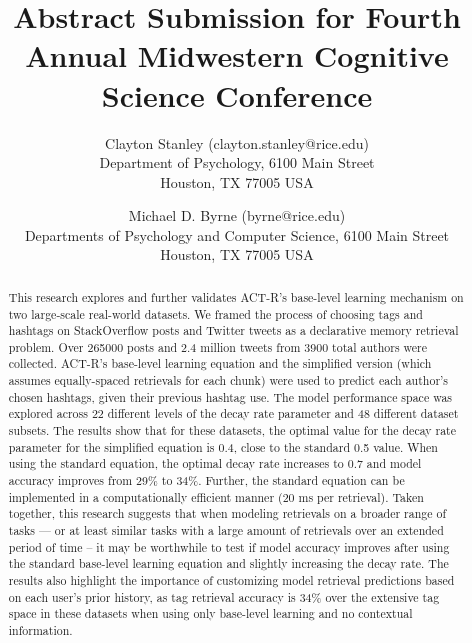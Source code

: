 \documentclass[english]{article}
\title{Abstract Submission for Fourth Annual Midwestern Cognitive Science Conference}
\author{Clayton Stanley (clayton.stanley@rice.edu) \\
  Department of Psychology, 6100 Main Street \\
  Houston, TX 77005 USA 
  \and Michael D. Byrne (byrne@rice.edu) \\
  Departments of Psychology and Computer Science, 6100 Main Street \\
  Houston, TX 77005 USA \\
}
\begin{document}
\maketitle

\begin{abstract}
  This research explores and further validates ACT-R's base-level learning mechanism on two large-scale real-world datasets.
  We framed the process of choosing tags and hashtags on StackOverflow posts and Twitter tweets as a declarative memory retrieval problem.
  Over \num{265000} posts and 2.4 million tweets from \num{3900} total authors were collected. 
  ACT-R's base-level learning equation and the simplified version (which assumes equally-spaced retrievals for each chunk) were used to predict each author's chosen hashtags, given their previous hashtag use.
  The model performance space was explored across 22 different levels of the decay rate parameter and 48 different dataset subsets.
  The results show that for these datasets, the optimal value for the decay rate parameter for the simplified equation is 0.4, close to the standard 0.5 value. 
  When using the standard equation, the optimal decay rate increases to 0.7 and model accuracy improves from 29\% to 34\%. 
  Further, the standard equation can be implemented in a computationally efficient manner (20 ms per retrieval).
  Taken together, this research suggests that when modeling retrievals on a broader range of tasks --- or at least similar tasks with a large amount of retrievals over an extended period of time --
  it may be worthwhile to test if model accuracy improves after using the standard base-level learning equation and slightly increasing the decay rate.
  The results also highlight the importance of customizing model retrieval predictions based on each user's prior history,
  as tag retrieval accuracy is 34\% over the extensive tag space in these datasets when using only base-level learning and no contextual information.
\end{abstract}
\end{document}
